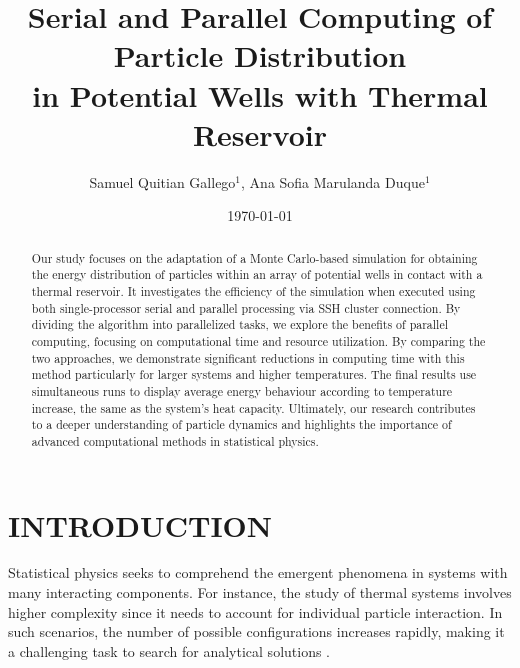 \documentclass[%
 reprint,
 amsmath,amssymb,
 aps,
]{revtex4-2}
\begin{document}

\title{Serial and Parallel Computing of Particle Distribution \\ in Potential Wells with Thermal Reservoir }%


\author{Samuel Quitian Gallego$^{1}$, Ana Sofia Marulanda Duque$^{1}$}

\date{\today}

\begin{abstract}
Our study focuses on the adaptation of a Monte Carlo-based simulation for obtaining the energy distribution of particles within an array of potential wells in contact with a thermal reservoir. It
investigates the efficiency of the simulation when executed using both single-processor serial and parallel processing via SSH cluster connection. By dividing the algorithm into parallelized tasks, we explore the benefits of parallel computing, focusing on computational time and resource utilization. By comparing the two approaches, we demonstrate significant reductions in computing time with this method particularly for larger systems and higher temperatures. The final results use simultaneous runs to display average energy behaviour according to temperature increase, the same as the system's heat capacity.
Ultimately, our research contributes to a deeper understanding of particle dynamics and highlights the importance of advanced computational methods in statistical physics.


\end{abstract}

\maketitle


\section{\label{sec:level1}INTRODUCTION}
Statistical physics seeks to comprehend the emergent phenomena in systems with many interacting components. For instance, the study of thermal systems involves higher complexity since it needs to account for individual particle interaction. In such scenarios, the number of possible configurations increases rapidly, making it a challenging task to search for analytical solutions \cite{machta_complexity_2006}.
\end{document}
